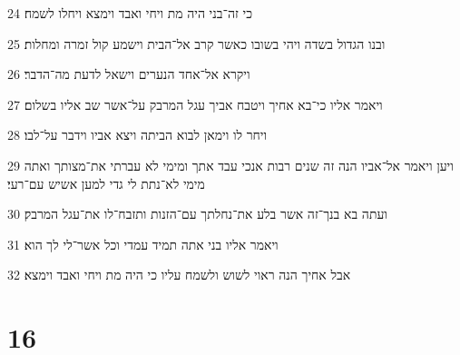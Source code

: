\par 24 כי זה־בני היה מת ויחי ואבד וימצא ויחלו לשמח׃
\par 25 ובנו הגדול בשדה ויהי בשובו כאשר קרב אל־הבית וישמע קול זמרה ומחלות׃
\par 26 ויקרא אל־אחד הנערים וישאל לדעת מה־הדבר׃
\par 27 ויאמר אליו כי־בא אחיך ויטבח אביך עגל המרבק על־אשר שב אליו בשלום׃
\par 28 ויחר לו וימאן לבוא הביתה ויצא אביו וידבר על־לבו׃
\par 29 ויען ויאמר אל־אביו הנה זה שנים רבות אנכי עבד אתך ומימי לא עברתי את־מצותך ואתה מימי לא־נתת לי גדי למען אשיש עם־רעי׃
\par 30 ועתה בא בנך־זה אשר בלע את־נחלתך עם־הזנות ותזבח־לו את־עגל המרבק׃
\par 31 ויאמר אליו בני אתה תמיד עמדי וכל אשר־לי לך הוא׃
\par 32 אבל אחיך הנה ראוי לשוש ולשמח עליו כי היה מת ויחי ואבד וימצא׃

\chapter{16}


